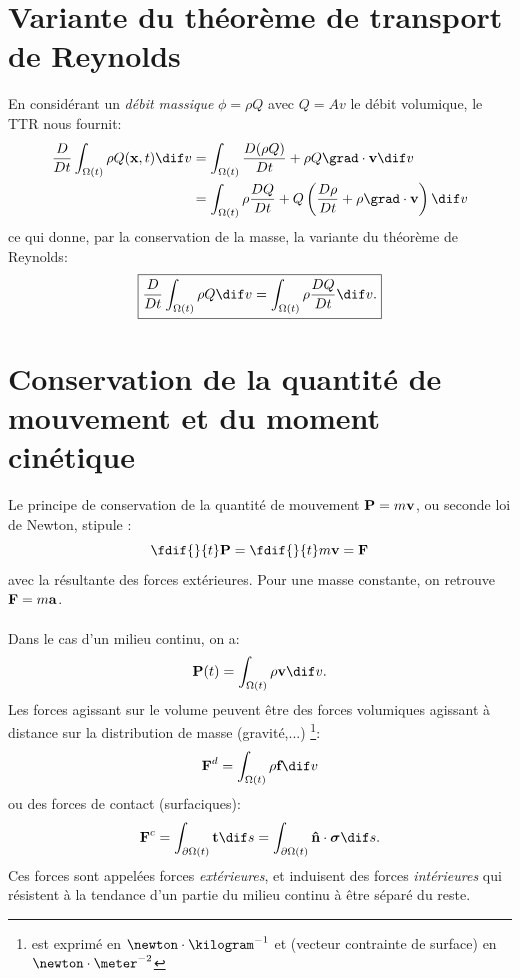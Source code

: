 \section{Variante du théorème de transport de Reynolds}
En considérant un \emph{débit massique} $\phi = \rho Q$ avec $Q = Av$ le débit volumique, le TTR nous fournit:
\begin{align*}
  \frac{D}{Dt}\int_{\Omega (t)}\rho Q(\fv{x},t) \dif v & = \int_{\Omega (t)}\frac{D(\rho Q)}{Dt} + \rho Q \div{\fv{v}} \dif v\\
                                                       & = \int_{\Omega (t)}\rho\frac{DQ}{Dt} + Q\left(\frac{D\rho}{Dt} + \rho\div{\fv{v}}\right) \dif v
\end{align*}
ce qui donne, par la conservation de la masse, la variante du théorème de Reynolds:
\begin{equation}
  \label{ttr2}
  \boxed{\frac{D}{Dt}\int_{\Omega (t)}\rho Q \dif v=\int_{\Omega(t)}\rho\frac{DQ}{Dt} \dif v.}
\end{equation}

\section{Conservation de la quantité de mouvement et du moment cinétique}
Le principe de conservation de la quantité de mouvement $\textbf{P}=m\textbf{v}$, ou seconde loi de Newton, stipule : $$\fdif{}{t}\fv{P}=\fdif{}{t}m\fv{v}=\fv{F}$$ avec  la résultante des forces extérieures. Pour une masse constante, on retrouve $\textbf{F}=m\textbf{a}$.
\paragraph{}
Dans le cas d'un milieu continu, on a: $$\fv{P}(t)=\int_{\Omega(t)}\rho\fv{v} \dif v.$$
Les forces agissant sur le volume peuvent être des forces volumiques agissant à distance sur la distribution de masse (gravité,...)
\footnote{ est exprimé en $\newton\cdot\kilogram^{-1}$ et  (vecteur contrainte de surface) en $\newton\cdot\meter^{-2}$}: $$\fv{F}^d=\int_{\Omega (t)}\rho\fv{f} \dif v$$  ou des forces de contact (surfaciques): $$\fv{F}^c=\int_{\partial \Omega (t)}\fv{t} \dif s=\int_{\partial \Omega (t)}\fv{\^n}\cdot\boldsymbol{\sigma} \dif s.$$ Ces forces sont appelées forces \emph{extérieures}, et induisent des forces \emph{intérieures} qui résistent à la tendance d'un partie du milieu continu à être séparé du reste.
